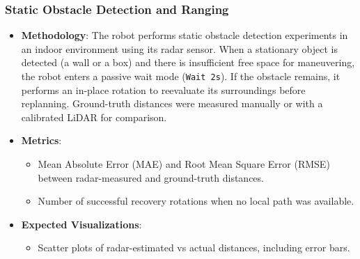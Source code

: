 \subsubsection{Static Obstacle Detection and Ranging}
\begin{itemize}
    \item \textbf{Methodology}:  
    The robot performs static obstacle detection experiments in an indoor environment using its radar sensor. When a stationary object is detected (a wall or a box) and there is insufficient free space for maneuvering, the robot enters a passive wait mode (\texttt{Wait 2s}). If the obstacle remains, it performs an in-place rotation to reevaluate its surroundings before replanning. Ground-truth distances were measured manually or with a calibrated LiDAR for comparison.

    \item \textbf{Metrics}:
    \begin{itemize}
        \item Mean Absolute Error (MAE) and Root Mean Square Error (RMSE) between radar-measured and ground-truth distances.
        \item Number of successful recovery rotations when no local path was available.
    \end{itemize}

    \item \textbf{Expected Visualizations}:
    \begin{itemize}
        \item Scatter plots of radar-estimated vs actual distances, including error bars.
    \end{itemize}
\end{itemize}

